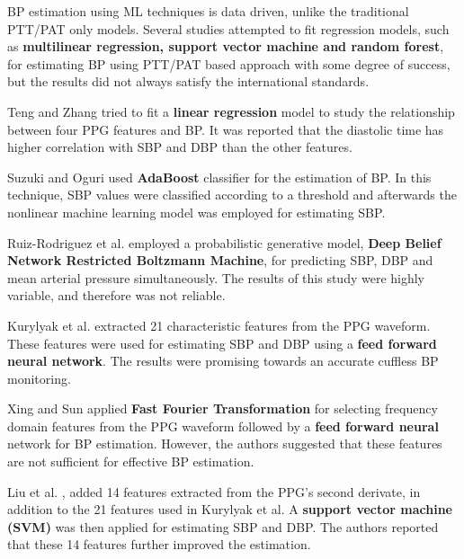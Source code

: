 \documentclass[12pt, bibliography=totoc]{scrartcl}
\begin{document}
BP estimation using ML techniques is data driven, unlike the traditional PTT/PAT only models. Several studies attempted to fit regression models, such as \textbf{multilinear regression, support vector machine and random forest}, for estimating BP using PTT/PAT based approach with some degree of success, but the results did not always satisfy the international standards.\newline

Teng and Zhang \cite{tengContinuousNoninvasiveEstimation2003} tried to fit a \textbf{linear regression} model to study the relationship between four PPG features and BP. It was reported that the diastolic time has higher correlation with SBP and DBP than the other features.

Suzuki and Oguri \cite{suzukiCufflessBloodPressure2009} used \textbf{AdaBoost} classifier for the estimation of BP. In this technique, SBP values were classified according to a threshold and afterwards the nonlinear machine learning model was employed for estimating SBP.

Ruiz-Rodriguez et al. \cite{ruiz-rodriguezInnovativeContinuousNoninvasive2013} employed a probabilistic generative model, \textbf{Deep Belief Network Restricted Boltzmann Machine}, for predicting SBP, DBP and mean arterial pressure simultaneously. The results of this study were highly variable, and therefore was not reliable.

Kurylyak et al. \cite{kurylyakNeuralNetworkbasedMethod2013} extracted 21 characteristic features from the PPG waveform. These features were used for estimating SBP and DBP using a \textbf{feed forward neural network}. The results were promising towards an accurate cuffless BP monitoring.

Xing and Sun \cite{xingOpticalBloodPressure2016} applied \textbf{Fast Fourier Transformation} for selecting frequency domain features from the PPG waveform followed by a \textbf{feed forward neural} network for BP estimation. However, the authors suggested that these features are not sufficient for effective BP estimation.

Liu et al. \cite{liuIntegratedNavigationTethered2017}, added 14 features extracted from the PPG’s second derivate, in addition to the 21 features used in Kurylyak et al. A \textbf{support vector machine (SVM)} was then applied for estimating SBP and DBP. The authors reported that these 14 features further improved the estimation.\newline 
\end{document}
